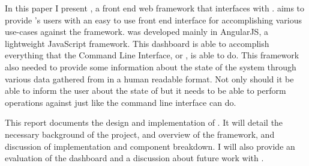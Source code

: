 
\pagestyle{empty}
\setlength{\baselineskip}{0.8cm}



In this paper I present \projectName{}, a front end web framework that interfaces with \ancor{}. \projectName{} aims to provide \ancor{}’s users with an easy to use front end interface for accomplishing various use-cases against the \ancor{} framework. \projectName{} was developed mainly in AngularJS, a lightweight JavaScript framework. This dashboard is able to accomplish everything that the \ancor{} Command Line Interface, or \ancorcli, is able to do. This framework also needed to provide some information about the state of the system through various data gathered from \ancor{} in a human readable format. Not only should it be able to inform the user about the state of \ancor{} but it needs to be able to perform operations against \ancor{} just like the command line interface can do.

This report documents the design and implementation of \projectName. It will detail the necessary background of the project, and overview of the framework, and discussion of implementation and component breakdown. I will also provide an evaluation of the dashboard and a discussion about future work with \projectName{}.
